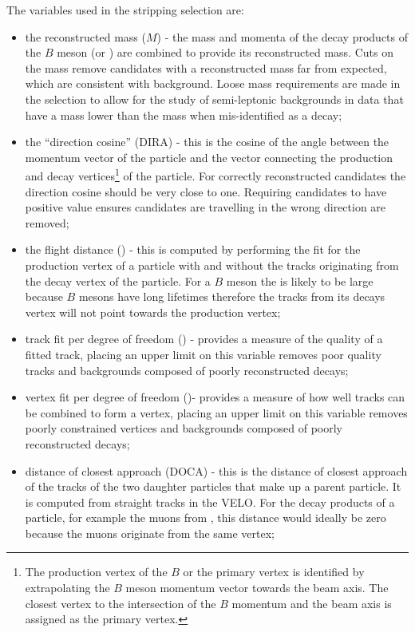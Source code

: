 The variables used in the stripping selection are:
\begin{itemize}
\item the reconstructed mass ($M$) - the mass and momenta of the decay products of the $B$ meson (or \jpsi) are combined to provide its reconstructed mass. Cuts on the mass remove candidates with a reconstructed mass far from expected, which are consistent with background. Loose mass requirements are made in the \bmumu selection to allow for the study of semi-leptonic backgrounds in data that have a mass lower than the \bsd mass when mis-identified as a \bmumu decay;
\item the ``direction cosine'' (DIRA) - this is the cosine of the angle between the momentum vector of the particle and the vector connecting the production and decay vertices\footnote{The production vertex of the $B$ or the primary vertex is identified by extrapolating the $B$ meson momentum vector towards the beam axis. The closest vertex to the intersection of the $B$ momentum and the beam axis is assigned as the primary vertex.} of the particle. For correctly reconstructed candidates the direction cosine should be very close to one. Requiring candidates to have positive value ensures candidates are travelling in the wrong direction are removed;
\item the flight distance \chisqd (\chiFD) - this is computed by performing the fit for the production vertex of a particle with and without the tracks originating from the decay vertex of the particle. For a $B$ meson the \chiFD is likely to be large because $B$ mesons have long lifetimes therefore the tracks from its decays vertex will not point towards the production vertex;
\item track fit \chisqd per degree of freedom (\chitrk) - provides a measure of the quality of a fitted track, placing an upper limit on this variable removes poor quality tracks and backgrounds composed of poorly reconstructed decays;
\item vertex fit \chisqd per degree of freedom  (\chivtx)- provides a measure of how well tracks can be combined to form a vertex, placing an upper limit on this variable removes poorly constrained vertices and backgrounds composed of poorly reconstructed decays;
\item distance of closest approach (DOCA) - this is the distance of closest approach of the tracks of the two daughter particles that make up a parent particle. It is computed from straight tracks in the VELO. For the decay products of a particle, for example the muons from \bmumu, this distance would ideally be zero because the muons originate from the same vertex;

\end{itemize}
